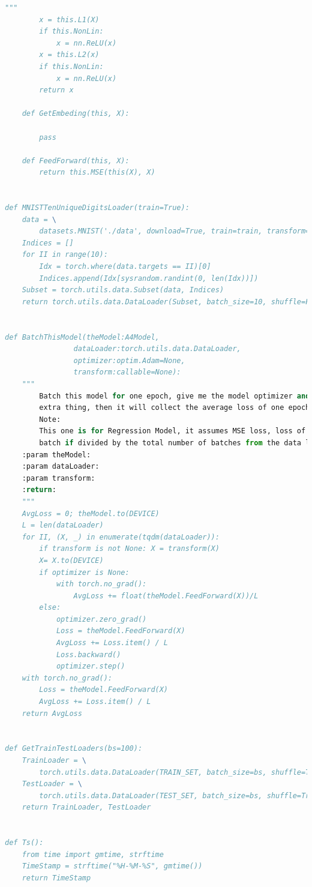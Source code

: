 \documentclass[]{article}
\begin{document}
\begin{lstlisting}[language=python]
        """
        x = this.L1(X)
        if this.NonLin:
            x = nn.ReLU(x)
        x = this.L2(x)
        if this.NonLin:
            x = nn.ReLU(x)
        return x

    def GetEmbeding(this, X):

        pass

    def FeedForward(this, X):
        return this.MSE(this(X), X)


def MNISTTenUniqueDigitsLoader(train=True):
    data = \
        datasets.MNIST('./data', download=True, train=train, transform=TRANSFORM)
    Indices = []
    for II in range(10):
        Idx = torch.where(data.targets == II)[0]
        Indices.append(Idx[sysrandom.randint(0, len(Idx))])
    Subset = torch.utils.data.Subset(data, Indices)
    return torch.utils.data.DataLoader(Subset, batch_size=10, shuffle=False)


def BatchThisModel(theModel:A4Model,
                dataLoader:torch.utils.data.DataLoader,
                optimizer:optim.Adam=None,
                transform:callable=None):
    """
        Batch this model for one epoch, give me the model optimizer and some
        extra thing, then it will collect the average loss of one epoch.
        Note:
        This one is for Regression Model, it assumes MSE loss, loss of each
        batch if divided by the total number of batches from the data loader.
    :param theModel:
    :param dataLoader:
    :param transform:
    :return:
    """
    AvgLoss = 0; theModel.to(DEVICE)
    L = len(dataLoader)
    for II, (X, _) in enumerate(tqdm(dataLoader)):
        if transform is not None: X = transform(X)
        X= X.to(DEVICE)
        if optimizer is None:
            with torch.no_grad():
                AvgLoss += float(theModel.FeedForward(X))/L
        else:
            optimizer.zero_grad()
            Loss = theModel.FeedForward(X)
            AvgLoss += Loss.item() / L
            Loss.backward()
            optimizer.step()
    with torch.no_grad():
        Loss = theModel.FeedForward(X)
        AvgLoss += Loss.item() / L
    return AvgLoss


def GetTrainTestLoaders(bs=100):
    TrainLoader = \
        torch.utils.data.DataLoader(TRAIN_SET, batch_size=bs, shuffle=True)
    TestLoader = \
        torch.utils.data.DataLoader(TEST_SET, batch_size=bs, shuffle=True)
    return TrainLoader, TestLoader


def Ts():
    from time import gmtime, strftime
    TimeStamp = strftime("%H-%M-%S", gmtime())
    return TimeStamp



\end{lstlisting}
\end{document}
